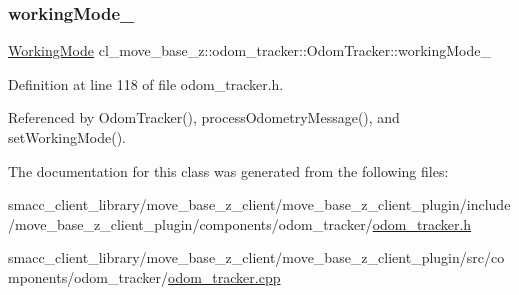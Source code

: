\subsubsection{\texorpdfstring{working\+Mode\+\_\+}{workingMode\_}}
{\footnotesize\ttfamily \hyperlink{namespacecl__move__base__z_1_1odom__tracker_ac46b05813b2791604f6cd0a39ace3ef8}{Working\+Mode} cl\+\_\+move\+\_\+base\+\_\+z\+::odom\+\_\+tracker\+::\+Odom\+Tracker\+::working\+Mode\+\_\+\hspace{0.3cm}{\ttfamily [protected]}}



Definition at line 118 of file odom\+\_\+tracker.\+h.



Referenced by Odom\+Tracker(), process\+Odometry\+Message(), and set\+Working\+Mode().



The documentation for this class was generated from the following files\+:\begin{DoxyCompactItemize}
\item 
smacc\+\_\+client\+\_\+library/move\+\_\+base\+\_\+z\+\_\+client/move\+\_\+base\+\_\+z\+\_\+client\+\_\+plugin/include/move\+\_\+base\+\_\+z\+\_\+client\+\_\+plugin/components/odom\+\_\+tracker/\hyperlink{odom__tracker_8h}{odom\+\_\+tracker.\+h}\item 
smacc\+\_\+client\+\_\+library/move\+\_\+base\+\_\+z\+\_\+client/move\+\_\+base\+\_\+z\+\_\+client\+\_\+plugin/src/components/odom\+\_\+tracker/\hyperlink{odom__tracker_8cpp}{odom\+\_\+tracker.\+cpp}\end{DoxyCompactItemize}

